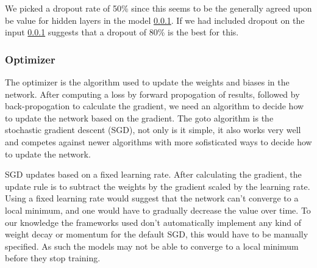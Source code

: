We picked a dropout rate of 50\% since this seems to be the generally agreed
upon be value for hidden layers in the model \ref{}. If we had included dropout
on the input \ref{} suggests that a dropout of 80\% is the best for this.


\subsubsection{Optimizer}

The optimizer is the algorithm used to update the weights and biases in the
network. After computing a loss by forward propogation of results, followed by
back-propogation to calculate the gradient, we need an algorithm to decide how
to update the network based on the gradient. The goto algorithm is the
stochastic gradient descent (SGD), not only is it simple, it also works very
well and competes against newer algorithms with more sofisticated ways to decide
how to update the network.

SGD updates based on a fixed learning rate. After calculating the gradient, the
update rule is to subtract the weights by the gradient scaled by the learning
rate. Using a fixed learning rate would suggest that the network can't converge
to a local minimum, and one would have to gradually decrease the value over
time. To our knowledge the frameworks used don't automatically implement any
kind of weight decay or momentum for the default SGD, this would have to be
manually specified. As such the models may not be able to converge to a local
minimum before they stop training.
